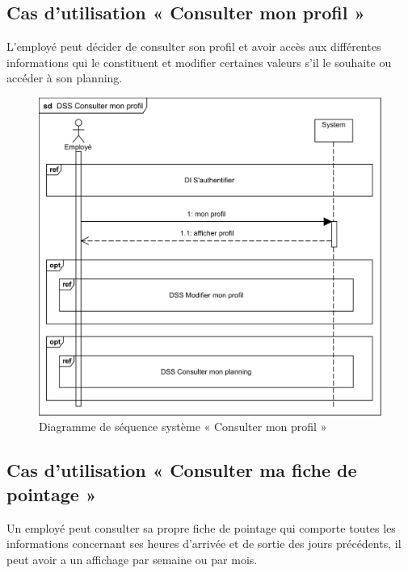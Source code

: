     \subsection{Cas d'utilisation « Consulter mon profil »}
    L’employé peut décider de consulter son profil et avoir accès aux différentes informations qui le constituent et modifier certaines valeurs s’il le souhaite ou accéder à son planning. 
     
        \begin{figure}[h!]
             \centering
             \includegraphics[scale=0.9]{images/DSS/DSS Consulter mon profil.png}
             \caption{Diagramme de séquence système « Consulter mon profil »}
             \label{fig4}
        \end{figure}


    \subsection{Cas d'utilisation « Consulter ma  fiche de pointage »}
        Un employé peut consulter sa propre fiche de pointage qui comporte toutes les informations concernant ses heures d’arrivée et de sortie des jours précédents, il peut avoir a un affichage par semaine ou par mois.
       
